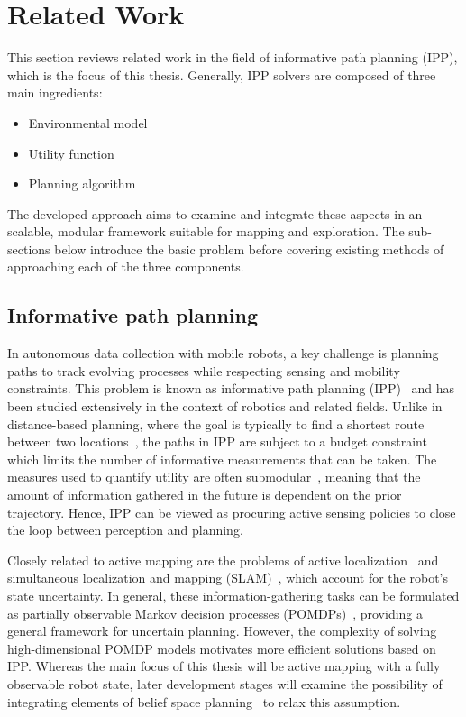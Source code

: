 \section{Related Work}
\label{S:related_work}

This section reviews related work in the field of informative path planning (IPP), which is the focus of 
this thesis. Generally, IPP solvers are composed of three main ingredients: 

\begin{itemize}
 \item Environmental model
 \item Utility function
 \item Planning algorithm
\end{itemize}

The developed approach aims to examine and integrate these aspects in an scalable, modular framework 
suitable for mapping and exploration. The sub-sections below introduce the basic problem before covering 
existing methods of approaching each of the three components.

\subsection{Informative path planning}

In autonomous data collection with mobile robots, a key challenge is planning paths to track evolving 
processes while respecting sensing and mobility constraints. This problem is known as informative 
path planning (IPP)~\cite{Singh2009} and has been studied extensively in the context of robotics and 
related fields. Unlike in distance-based planning, where the goal is typically to find a shortest 
route between two locations~\cite{Dijkstra1959}, the paths in IPP are subject to a budget constraint 
which limits the number of informative measurements that can be taken. The measures used to quantify 
utility are often submodular~\cite{Krause2011}, meaning that the amount of information gathered in the 
future is dependent on the prior trajectory. Hence, IPP can be viewed as procuring active 
sensing policies to close the loop between perception and planning.

Closely related to active mapping are the problems of active localization~\cite{Thrun1999} and simultaneous 
localization and mapping (SLAM)~\cite{Mu2015, Indelman2014, Bry2011}, which account for the robot's 
state uncertainty. In general, these information-gathering tasks can be formulated as partially observable 
Markov decision processes (POMDPs)~\cite{Kaelbling1998}, providing a general framework for uncertain 
planning. However, the complexity of solving high-dimensional POMDP models motivates more 
efficient solutions based on IPP. Whereas the main focus of this thesis will be active mapping with a 
fully observable robot state, later development stages will examine the possibility of integrating 
elements of belief space planning~\cite{Indelman2014, Indelman2015a} to relax this assumption.

